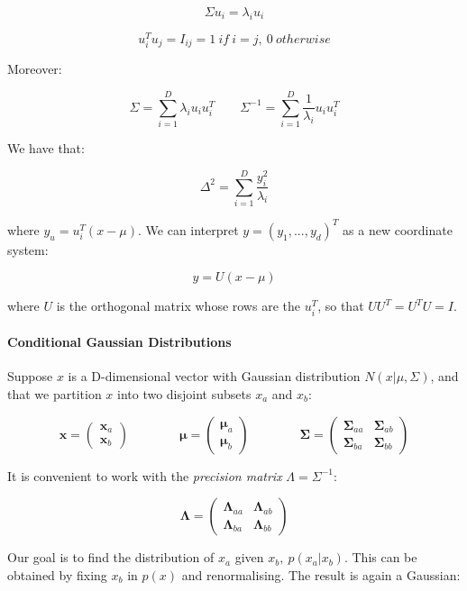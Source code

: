 \documentclass{article}
\begin{document}
\[\Sigma u_i = \lambda_i u_i\]

\[u_i^T u_j = I_{ij} = 1\ if\ i=j,\ 0\ otherwise\]

Moreover:

\[\Sigma = \sum_{i=1}^D \lambda_i u_i u_i^T \qquad \Sigma^{-1} = \sum_{i=1}^D
\frac{1}{\lambda_i} u_i u_i^T\]

We have that:

\[\Delta^2 = \sum_{i=1}^D \frac{y_i^2}{\lambda_i}\]

where \(y_u = u_i^T (x - \mu )\). We can interpret
\(y = (y_1, ..., y_d)^T\) as a new coordinate system:

\[y = U (x - \mu)\]

where \(U\) is the orthogonal matrix whose rows are the \(u_i^T\), so
that \(UU^T =
U^T U = I\).

\paragraph{Conditional Gaussian
Distributions}\label{conditional-gaussian-distributions}

Suppose \(x\) is a D-dimensional vector with Gaussian distribution
\(N(x|\mu,
\Sigma)\), and that we partition \(x\) into two disjoint subsets \(x_a\)
and \(x_b\):

\[
\bm{x} = \begin{pmatrix} \bm{x}_a \\ \bm{x}_b \end{pmatrix} 
\qquad\qquad 
\bm{\mu} = \begin{pmatrix} \bm{\mu}_a \\ \bm{\mu}_b \end{pmatrix} 
\qquad\qquad 
\bm{\Sigma} = \begin{pmatrix} \bm{\Sigma}_{aa} & \bm{\Sigma}_{ab} \\ \bm{\Sigma}_{ba} & \bm{\Sigma}_{bb} \end{pmatrix}
\]

It is convenient to work with the \emph{precision matrix}
\(\Lambda = \Sigma^{-1}\):

\[
\bm{\Lambda} = \begin{pmatrix} \bm{\Lambda}_{aa} & \bm{\Lambda}_{ab} \\ \bm{\Lambda}_{ba} & \bm{\Lambda}_{bb} \end{pmatrix}
\]

Our goal is to find the distribution of \(x_a\) given
\(x_b,\ p(x_a | x_b)\). This can be obtained by fixing \(x_b\) in
\(p(x)\) and renormalising. The result is again a Gaussian:
\end{document}
